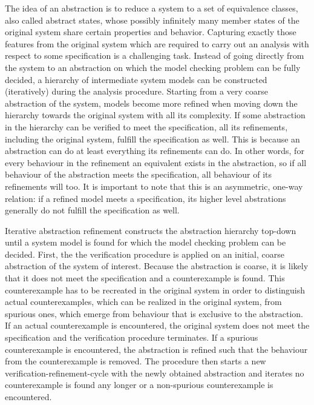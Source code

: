 The idea of an abstraction is to reduce a system to a set of equivalence classes, also called abstract states, whose possibly infinitely many member states of the original system share certain properties and behavior.
Capturing exactly those features from the original system which are required to carry out an analysis with respect to some specification is a challenging task.
Instead of going directly from the system to an abstraction on which the model checking problem can be fully decided, a hierarchy of intermediate system models can be constructed (iteratively) during the analysis procedure.
Starting from a very coarse abstraction of the system, models become more refined when moving down the hierarchy towards the original system with all its complexity.
If some abstraction in the hierarchy can be verified to meet the specification, all its refinements, including the original system, fulfill the specification as well.
This is because an abstraction can do at least everything its refinements can do.
In other words, for every behaviour in the refinement an equivalent exists in the abstraction, so if all behaviour of the abstraction meets the specification, all behaviour of its refinements will too. %
It is important to note that this is an asymmetric, one-way relation: if a refined model meets a specification, its higher level abstrations generally do not fulfill the specification as well.

Iterative abstraction refinement constructs the abstraction hierarchy top-down until a system model is found for which the model checking problem can be decided.
First, the the verification procedure is applied on an initial, coarse abstraction of the system of interest.
Because the abstraction is coarse, it is likely that it does not meet the specification and a counterexample is found.
This counterexample has to be recreated in the original system in order to distinguish actual counterexamples, which can be realized in the original system, from spurious ones, which emerge from behaviour that is exclusive to the abstraction.
If an actual counterexample is encountered, the original system does not meet the specification and the verification procedure terminates.
If a spurious counterexample is encountered, the abstraction is refined such that the behaviour from the counterexample is removed.
The procedure then starts a new verification-refinement-cycle with the newly obtained abstraction and iterates no counterexample is found any longer or a non-spurious counterexample is encountered.

